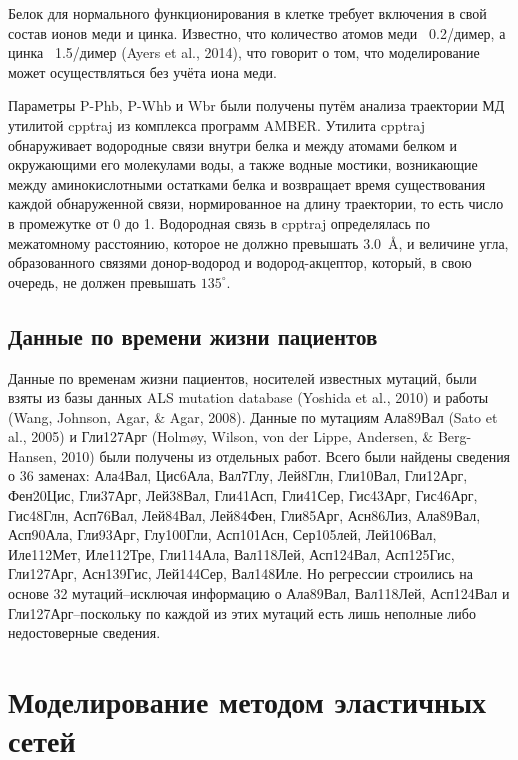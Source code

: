 Белок для нормального функционирования в клетке требует включения в свой состав ионов меди и цинка. Известно, что количество атомов меди ~0.2/димер, а цинка ~1.5/димер (Ayers et al., 2014), что говорит о том, что моделирование может осуществляться без учёта иона меди. 

Параметры P-Phb, P-Whb и Wbr были получены путём анализа траектории МД утилитой cpptraj из комплекса программ AMBER. Утилита cpptraj обнаруживает водородные связи внутри белка и между атомами белком и окружающими его молекулами воды, а также водные мостики, возникающие между аминокислотными остатками белка и возвращает время существования каждой обнаруженной связи, нормированное на длину траектории, то есть число в промежутке от 0 до 1.  Водородная связь в cpptraj определялась по межатомному расстоянию, которое не должно превышать 3.0~\AA, и величине угла, образованного связями донор-водород и водород-акцептор, который, в свою очередь, не должен превышать $135^\circ$.

\subsection{Данные по времени жизни пациентов} \label{subsect_survival_data}

Данные по временам жизни пациентов, носителей известных мутаций, были взяты из базы данных ALS mutation database (Yoshida et al., 2010) и работы (Wang, Johnson, Agar, \& Agar, 2008). Данные по мутациям Ала89Вал (Sato et al., 2005) и Гли127Арг (Holmøy, Wilson, von der Lippe, Andersen, \& Berg-Hansen, 2010) были получены из отдельных работ. Всего были найдены сведения о 36 заменах: Ала4Вал, Цис6Ала, Вал7Глу, Лей8Глн, Гли10Вал, Гли12Арг, Фен20Цис, Гли37Арг, Лей38Вал, Гли41Асп, Гли41Сер, Гис43Арг, Гис46Арг, Гис48Глн, Асп76Вал, Лей84Вал, Лей84Фен, Гли85Арг, Асн86Лиз, Ала89Вал, Асп90Ала, Гли93Арг, Глу100Гли, Асп101Асн, Сер105лей, Лей106Вал, Иле112Мет, Иле112Тре, Гли114Ала, Вал118Лей, Асп124Вал, Асп125Гис, Гли127Арг, Асн139Гис, Лей144Сер, Вал148Иле. Но регрессии строились на основе 32 мутаций--исключая информацию о Ала89Вал, Вал118Лей, Асп124Вал и Гли127Арг--поскольку по каждой из этих мутаций есть лишь неполные либо недостоверные сведения.

\section{Моделирование методом эластичных сетей} \label{sect_EN}


